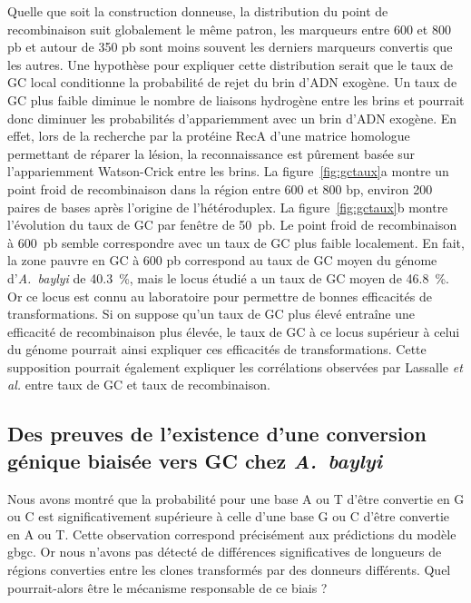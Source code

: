 Quelle que soit la construction donneuse, la distribution du point de
recombinaison suit globalement le même patron, les marqueurs entre \num{600} et
\num{800} pb et autour de \num{350} pb sont moins souvent les derniers marqueurs
convertis que les autres. Une hypothèse pour expliquer cette distribution serait
que le taux de GC local conditionne la probabilité de rejet du brin d'ADN
exogène. Un taux de GC plus faible diminue le nombre de liaisons hydrogène entre
les brins et pourrait donc diminuer les probabilités d'appariemment avec un brin
d'ADN exogène. En effet, lors de la recherche par la protéine RecA d'une matrice
homologue permettant de réparer la lésion, la reconnaissance est pûrement basée
sur l'appariemment Watson-Crick entre les brins\cite{lee_base_2015}. La
figure~\ref{fig:gctaux}a montre un point froid de recombinaison dans la région
entre \num{600} et \num{800} bp, environ \num{200} paires de bases après
l'origine de l'hétéroduplex. La figure~\ref{fig:gctaux}b montre l'évolution du
taux de GC par fenêtre de \num{50}~pb. Le point froid de recombinaison à
\num{600}~pb semble correspondre avec un taux de GC plus faible localement. En
fait, la zone pauvre en GC à \num{600} pb correspond au taux de GC moyen du
génome d'\emph{A.~baylyi} de \SI{40.3}{\percent}, mais le locus étudié a un taux
de GC moyen de \SI{46.8}{\percent}. Or ce locus est connu au laboratoire pour
permettre de bonnes efficacités de transformations. Si on suppose qu'un taux de
GC plus élevé entraîne une efficacité de recombinaison plus élevée, le taux de
GC à ce locus supérieur à celui du génome pourrait ainsi expliquer ces
efficacités de transformations. Cette supposition pourrait également expliquer
les corrélations observées par Lassalle \emph{et
  al.}\cite{lassalle_gc-content_2015} entre taux de GC et taux de recombinaison.

\subsection{Des preuves de l'existence d'une conversion génique biaisée vers GC
  chez \textit{A.~baylyi}}

Nous avons montré que la probabilité pour une base A ou T d'être convertie en G
ou C est significativement supérieure à celle d'une base G ou C d'être convertie
en A ou T. Cette observation correspond précisément aux prédictions du modèle
\ac{gbgc}. Or nous n'avons pas détecté de différences significatives de
longueurs de régions converties entre les clones transformés par des donneurs
différents. Quel pourrait-alors être le mécanisme responsable de ce biais ?

